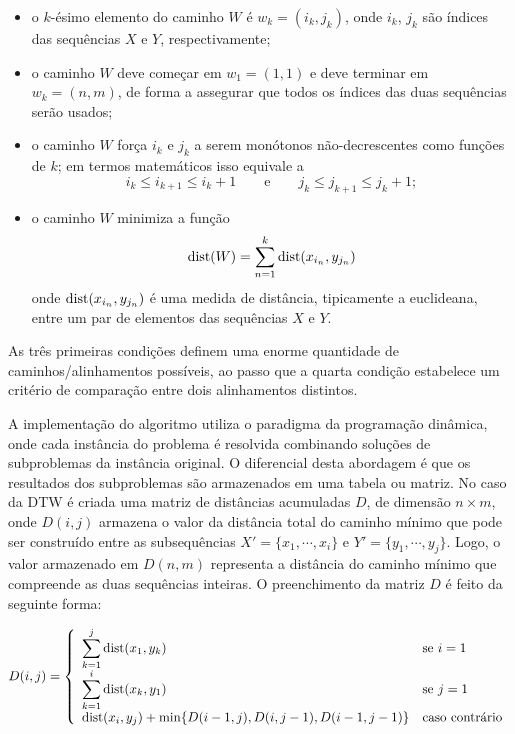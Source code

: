 \begin{itemize}
\item o $k$-ésimo elemento do caminho $W$ é $w_k = (i_k, j_k)$, onde $i_k$, $j_k$ são índices das sequências $X$ e $Y$, respectivamente;
\item o caminho $W$ deve começar em $w_1 = (1, 1)$ e deve terminar em $w_k = (n, m)$, de forma a assegurar que todos os índices das duas sequências serão usados;
\item o caminho $W$ força $i_k$ e $j_k$ a serem monótonos não-decrescentes como funções de $k$; em termos matemáticos isso equivale a
\begin{equation*}
    i_k \leq i_{k+1} \leq i_k + 1 \qquad \mbox{e} \qquad j_k\leq j_{k+1} \leq j_k + 1;
\end{equation*}
\item o caminho $W$ minimiza a função 
\begin{equation*}
    \mbox{dist}(W) = \sum_{n=1}^{k} \mbox{dist}(x_{i_n}, y_{j_n})
\end{equation*}
onde $\mbox{dist}(x_{i_n}, y_{j_n})$ é uma medida de distância, tipicamente a euclideana, entre um par de elementos das sequências $X$ e $Y$.
\end{itemize}

As três primeiras condições definem uma enorme quantidade de caminhos/alinhamentos possíveis, ao passo que a quarta condição estabelece um critério de comparação entre dois alinhamentos distintos.

A implementação do algoritmo utiliza o paradigma da programação dinâmica, onde cada instância do problema é resolvida combinando soluções de subproblemas da instância original. O diferencial desta abordagem é que os resultados dos subproblemas são armazenados em uma tabela ou matriz. No caso da DTW é criada uma matriz de distâncias acumuladas $D$, de dimensão $n \times m$, onde $D(i, j)$ armazena o valor da distância total do caminho mínimo que pode ser construído entre as subsequências $X' = \{x_1, \cdots, x_i\}$ e $Y' = \{y_1, \cdots, y_j\}$. Logo, o valor armazenado em $D(n, m)$ representa a distância do caminho mínimo que compreende as duas sequências inteiras. O preenchimento da matriz $D$ é feito da seguinte forma:

\begin{equation*}
    D(i, j) = \left\{\begin{array}{ll}
    \displaystyle\sum_{k=1}^j\mbox{dist}(x_1,y_k)&\mbox{se\ }i=1\\
    \displaystyle\sum_{k=1}^i\mbox{dist}(x_k,y_1)&\mbox{se\ }j=1\\
    \mbox{dist}(x_i, y_j) + \min\{D(i - 1, j), D(i, j - 1), D(i - 1, j - 1)\}&\mbox{caso contrário}
    \end{array}\right.
\end{equation*}


